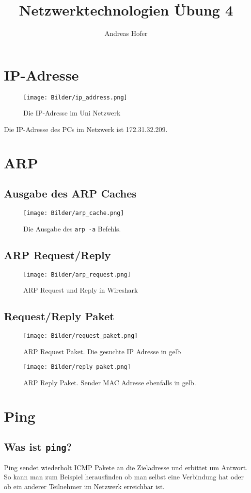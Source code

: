 \documentclass{article}
\title{\vspace{-1cm}Netzwerktechnologien Übung 4}
\author{Andreas Hofer}
\begin{document}
	\maketitle
	\section{IP-Adresse}
	\begin{figure}[H]
		\centering
		\texttt{[image: Bilder/ip\_address.png]}
		\caption{Die IP-Adresse im Uni Netzwerk}
	\end{figure}
	Die IP-Adresse des PCs im Netzwerk ist 172.31.32.209.
	\section{ARP}
	\subsection{Ausgabe des ARP Caches}
	\begin{figure}[H]
		\centering
		\texttt{[image: Bilder/arp\_cache.png]}
		\cprotect\caption{Die Ausgabe des \verb|arp -a|  Befehls.}
	\end{figure}
	\addtocounter{subsection}{2}
	\subsection{ARP Request/Reply}
	\begin{figure}[H]
		\centering
		\texttt{[image: Bilder/arp\_request.png]}
		\caption{ARP Request und Reply in Wireshark}
	\end{figure}
	\subsection{Request/Reply Paket}
	\begin{figure}[H]
	\centering
	\texttt{[image: Bilder/request\_paket.png]}
	\caption{ARP Request Paket. Die gesuchte IP Adresse in gelb}
	\end{figure}
	\begin{figure}[H]
	\centering
	\texttt{[image: Bilder/reply\_paket.png]}
	\caption{ARP Reply Paket. Sender MAC Adresse ebenfalls in gelb.}
	\end{figure}
	\section{Ping}
	\cprotect\subsection{Was ist \verb|ping|? }
	Ping sendet wiederholt ICMP Pakete an die Zieladresse und erbittet um Antwort. So kann man zum Beispiel herausfinden ob man selbst eine Verbindung hat oder ob ein anderer Teilnehmer im Netzwerk erreichbar ist.
\end{document}
